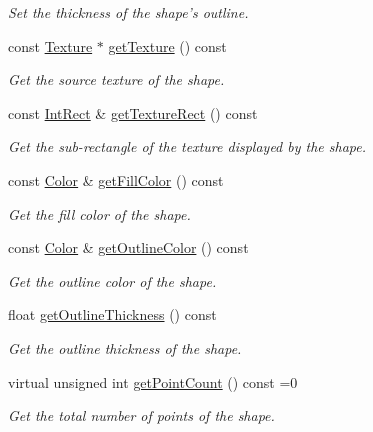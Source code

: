 \begin{DoxyCompactItemize}
\begin{DoxyCompactList}\small\item\em Set the thickness of the shape's outline. \end{DoxyCompactList}\item 
const \hyperlink{classsf_1_1_texture}{Texture} $\ast$ \hyperlink{classsf_1_1_shape_a1bf27ac425fcce36efd0eed67531a403}{get\+Texture} () const 
\begin{DoxyCompactList}\small\item\em Get the source texture of the shape. \end{DoxyCompactList}\item 
const \hyperlink{classsf_1_1_rect}{Int\+Rect} \& \hyperlink{classsf_1_1_shape_af7c4c80a435b85a622812711cf510439}{get\+Texture\+Rect} () const 
\begin{DoxyCompactList}\small\item\em Get the sub-\/rectangle of the texture displayed by the shape. \end{DoxyCompactList}\item 
const \hyperlink{classsf_1_1_color}{Color} \& \hyperlink{classsf_1_1_shape_ad7f7fe601a8bb24efe9aa77809a35c12}{get\+Fill\+Color} () const 
\begin{DoxyCompactList}\small\item\em Get the fill color of the shape. \end{DoxyCompactList}\item 
const \hyperlink{classsf_1_1_color}{Color} \& \hyperlink{classsf_1_1_shape_a4fa7d3bf5ee2332f6b9d9bebe9b1e2fd}{get\+Outline\+Color} () const 
\begin{DoxyCompactList}\small\item\em Get the outline color of the shape. \end{DoxyCompactList}\item 
float \hyperlink{classsf_1_1_shape_ac66f917b41eda6159a8ba6571d77f2ad}{get\+Outline\+Thickness} () const 
\begin{DoxyCompactList}\small\item\em Get the outline thickness of the shape. \end{DoxyCompactList}\item 
virtual unsigned int \hyperlink{classsf_1_1_shape_ad84e1b675ecd270ad8151aea4e271a78}{get\+Point\+Count} () const =0
\begin{DoxyCompactList}\small\item\em Get the total number of points of the shape. \end{DoxyCompactList}\item 

\end{DoxyCompactItemize}
